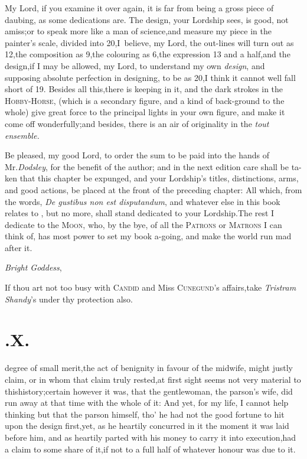 \documentclass{article}
\begin{document}
My Lord, if you examine it over\break 
again, it is far from being a gross piece\break
of daubing, as some dedications are.\break
The design, your
Lordship sees, is good, 
not amiss;\tsk  or to speak more like a man of
science,\tsk  and measure my piece in the painter’s scale,
divided into 20,\tsk  I~believe, my Lord, the out-lines will turn
out as 12,\tsk  the composition as 9,\tsk  the colouring as
6,\tsk  the expression 13 and a half,\tsk  and the
design,\tsk  if I may be allowed, my Lord, to understand my own
\textit{design}, and supposing absolute perfection in designing, to
be as 20,\tsk  I think it cannot well fall short of 19. Besides
all this,\tsk  there is keeping in it, and the dark strokes in the
\textsc{Hobby-Horse}, (which is a secondary
figure, and a kind of back-ground to the whole) give great force to the
principal lights in your own figure, and make it come off
wonderfully;\tsk  and besides, there is an air of originality in
the \textit{tout ensemble.}

Be pleased, my good Lord, to order the sum to be paid into the
hands of Mr.\break\textit{Dodsley}, for the benefit of the author; and in
the next edition care shall be ta-\break ken that this chapter be expunged,
and your Lordship’s titles, distinctions, arms, and good
actions, be placed at the front of the preceding chapter: All
which, from the words, \textit{De gustibus non est disputandum}, and
whatever else in this book relates to
, but no more, shall
stand dedicated to your Lordship.\tsk\break  The rest I dedicate to the
\textsc{Moon}, who, by the bye, of all the \textsc{Patrons} or
\textsc{Matrons} I can think of, has most power to set my
book a-going, and make the world run mad after it.

\vskip-6pt

\textit{Bright Goddess},

\vskip-6pt

If thou art not too busy with \textsc{Candid} and Miss
\textsc{Cunegund}’s affairs,\tsk  take \textit{Tristram
Shandy}’s under thy protection also.

\vskip-6pt

\enlargethispage\baselineskip

\section{.\enspace X.}

 degree of small merit,\break the
act of benignity in favour of the midwife, might justly claim, or in
whom that claim truly rested,\tsk  at first sight seems not very
material to this\break history;\tsh  certain however it was, that
the gentlewoman, the parson’s wife, did run away at that time
with the whole of it: And yet, for my life, I cannot help thinking
but that the parson himself, tho’ he had not the good fortune to
hit upon the design first,\tsk  yet, as he heartily concurred in
it the moment it was laid before him, and as heartily parted with\break
his money to carry it into execution,\break had a claim to some share of
it,\tsk  if not to a full half of whatever honour was due to
it.
\end{document}
